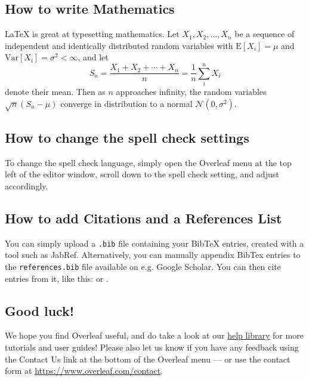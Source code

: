 \documentclass[12pt,a4paper,faculty=eb,language=en,doctype=article]{ugent-doc}
\begin{document}
\subsection{How to write Mathematics}

\LaTeX{} is great at typesetting mathematics.
Let $X_1, X_2, \ldots, X_n$ be a sequence of independent and identically distributed random variables with $\text{E}[X_i] = \mu$ and $\text{Var}[X_i] = \sigma^2 < \infty$, and let
\[S_n = \frac{X_1 + X_2 + \cdots + X_n}{n}
      = \frac{1}{n}\sum_{i}^{n} X_i\]
denote their mean.
Then as $n$ approaches infinity, the random variables $\sqrt{n}(S_n - \mu)$ converge in distribution to a normal $\mathcal{N}(0, \sigma^2)$.


\subsection{How to change the spell check settings}

To change the spell check language, simply open the Overleaf menu at the top left of the editor window, scroll down to the spell check setting, and adjust accordingly.


\subsection{How to add Citations and a References List}

You can simply upload a \texttt{.bib} file containing your BibTeX entries, created with a tool such as JabRef.
Alternatively, you can manually appendix BibTex entries to the \texttt{references.bib} file available on e.g. Google Scholar. You can then cite entries from it, like this: \textcite{greenwade93} or \parencite{greenwade93}.


\subsection{Good luck!}

We hope you find Overleaf useful, and do take a look at our \href{https://www.overleaf.com/learn}{help library} for more tutorials and user guides! Please also let us know if you have any feedback using the Contact Us link at the bottom of the Overleaf menu --- or use the contact form at \url{https://www.overleaf.com/contact}.
\end{document}

